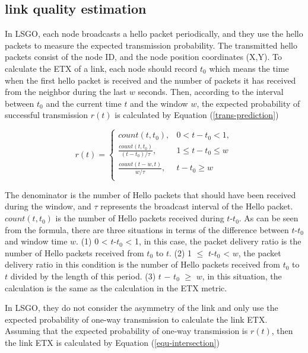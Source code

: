 \documentclass[conference]{IEEEtran}
\begin{document}
\subsection{link quality estimation}

  In LSGO, each node broadcasts a hello packet periodically, and they use the hello packets to measure the expected transmission probability.  The transmitted hello packets consist of the node ID, and the node position coordinates (X,Y).  To calculate the ETX of a link, each node should record $t_{0}$ which means the time when the first hello packet is received and the number of packets it has received from the neighbor during the last $w$ seconds. Then, according to the interval between $t_{0}$ and the current time $t$ and the window $w$, the expected probability of successful transmission $r(t)$ is calculated by Equation (\ref{trans-prediction})

\begin{equation}
\label{trans-prediction}
r(t) =\begin{cases}count(t, t_{0}), & 0 < t - t_{0} < 1,  \\ \frac{count(t,t_{0})}{(t-t_{0}) / \tau}, & 1 \leq t - t_{0} \leq w\\
\frac{count(t - w,t)}{w / \tau}, &  t - t_{0} \geq w\\
\end{cases}
\end{equation}

The denominator is the number of Hello packets that should have been received during the window, and $\tau$ represents the broadcast interval of the Hello packet. $count(t,t_{0})$ is the number of Hello packets received during $t$-$t_{0}$.  As can be seen from the formula, there are three situations in terms of the difference between $t$-$t_{0}$ and window time $w$. (1) 0 < $t$-$t_{0}$ < 1, in this case, the packet delivery ratio is the number of Hello packets received from $t_{0}$ to $t$. (2) 1 $\leq$ $t$-$t_{0}$ < $w$, the packet delivery ratio in this condition is the number of Hello packets received from $t_{0}$ to $t$ divided by the length of this period. (3) $t$ − $t_{0}$ $\geq$ $w$, in this situation, the calculation is the same as the calculation in the ETX metric.

In LSGO, they do not consider the asymmetry of the link and only use the expected probability of one-way transmission  to calculate the link ETX. Assuming that the expected probability of  one-way  transmission  is $r(t)$, then the link ETX is calculated by Equation (\ref{equ-intersection})
 
\end{document}
